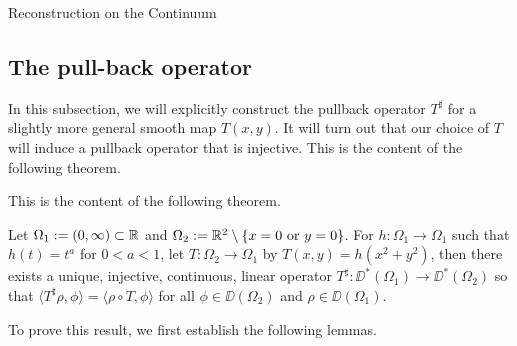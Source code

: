 \begin{chapter}{Reconstruction on the Continuum}
\subsection{The pull-back operator}
In this subsection, we will explicitly construct the pullback operator $T^\sharp$ for a slightly more general smooth map $T(x,y)$. 
It will turn out that our choice of $T$ will induce a pullback operator that is injective.
This is the content of the following theorem.

This is the content of the following theorem.
\begin{thm} \label{thm:pullback}
  Let $\Omega_1 := (0,\infty) \subset \mathbb R$ and $\Omega_2 := \mathbb R^2 \setminus \{x = 0\text{ or }y=0\}$.
  For $h:\Omega_1\to\Omega_1$ such that $h(t) = t^a$ for $0<a<1$, let $T:\Omega_2 \to \Omega_1$ by $T(x,y) = h(x^2 + y^2)$, then there exists a unique, injective, continuous, linear operator $T^\sharp:\DD^*(\Omega_1) \to \DD^*(\Omega_2)$ so that $\langle T^\sharp \rho ,\phi\rangle = \langle \rho \circ T,\phi\rangle$ for all $\phi \in \DD(\Omega_2)$ and $\rho \in \DD(\Omega_1)$.
\end{thm}

To prove this result, we first establish the following lemmas.


\end{chapter}
